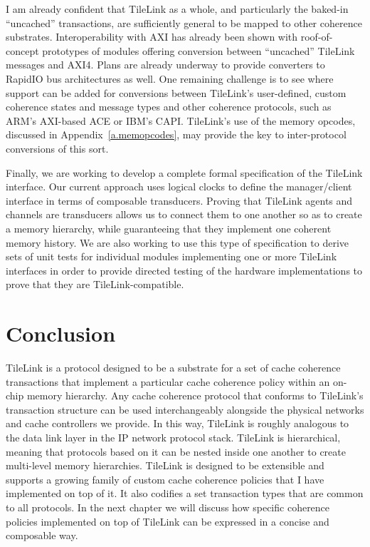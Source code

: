 I am already confident that TileLink as a whole, and particularly the baked-in ``uncached'' transactions,
are sufficiently general to be mapped to other coherence substrates.
Interoperability with AXI has already been shown with roof-of-concept prototypes of modules offering conversion between ``uncached'' TileLink messages and AXI4.
Plans are already underway to provide converters to RapidIO bus architectures as well.
One remaining challenge is to see where support can be added for conversions between TileLink's user-defined, custom coherence states and message types and other coherence protocols,
such as ARM's AXI-based ACE or IBM's CAPI.
TileLink's use of the memory opcodes, discussed in Appendix~\ref{a.memopcodes}, may provide the key to inter-protocol conversions of this sort.

Finally, we are working to develop a complete formal specification of the TileLink interface.
Our current approach uses logical clocks to define the manager/client interface in terms of composable transducers.
Proving that TileLink agents and channels are transducers allows us to connect them to one another so as to create a memory hierarchy,
while guaranteeing that they implement one coherent memory history.
We are also working to use this type of specification to derive sets of unit tests for individual modules implementing one or more TileLink interfaces
in order to provide directed testing of the hardware implementations to prove that they are TileLink-compatible.

\section{Conclusion}

TileLink is a protocol designed to be a substrate for a set of cache coherence transactions
that implement a particular cache coherence policy within an on-chip memory hierarchy.
Any cache coherence protocol that conforms to TileLink's transaction structure can be used interchangeably alongside the physical networks and cache controllers we provide.
In this way, TileLink is roughly analogous to the data link layer in the IP network protocol stack.
TileLink is hierarchical, meaning that protocols based on it can be nested inside one another to create multi-level memory hierarchies.
TileLink is designed to be extensible and supports a growing family of custom cache coherence policies that I have implemented on top of it.
It also codifies a set transaction types that are common to all protocols.
In the next chapter we will discuss how specific coherence policies implemented on top of TileLink can be expressed in a concise and composable way.

